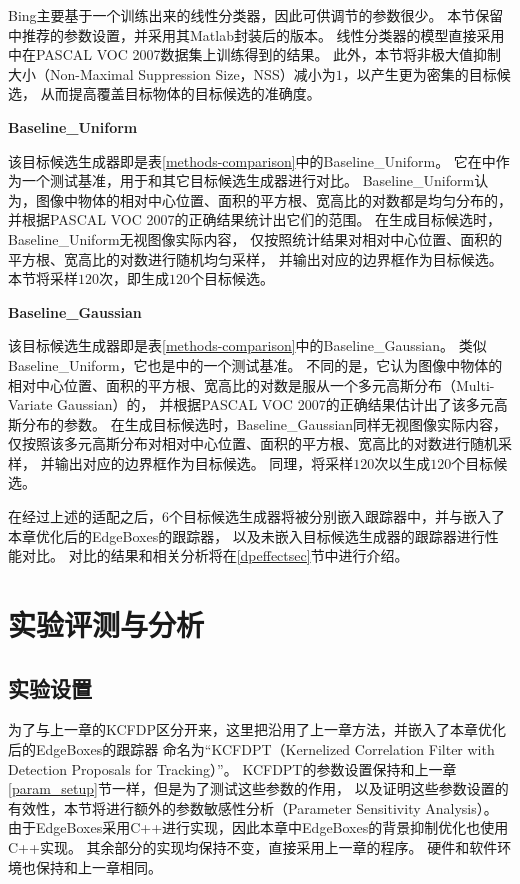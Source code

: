 Bing主要基于一个训练出来的线性分类器，因此可供调节的参数很少。
本节保留\cite{bing}中推荐的参数设置，并采用其Matlab封装后的版本。
线性分类器的模型直接采用\cite{bingImpl}中在PASCAL VOC 2007数据集上训练得到的结果。
此外，本节将非极大值抑制大小（Non-Maximal Suppression Size，NSS）减小为$1$，以产生更为密集的目标候选，
从而提高覆盖目标物体的目标候选的准确度。
\begin{compactitem}
\item \textbf{Baseline\_Uniform}
\end{compactitem}

该目标候选生成器即是表\ref{methods-comparison}中的Baseline\_Uniform。
它在\cite{dpsurvey}中作为一个测试基准，用于和其它目标候选生成器进行对比。
Baseline\_Uniform认为，图像中物体的相对中心位置、面积的平方根、宽高比的对数都是均匀分布的，
并根据PASCAL VOC 2007的正确结果统计出它们的范围。
在生成目标候选时，Baseline\_Uniform无视图像实际内容，
仅按照统计结果对相对中心位置、面积的平方根、宽高比的对数进行随机均匀采样，
并输出对应的边界框作为目标候选。
本节将采样$120$次，即生成$120$个目标候选。
\begin{compactitem}
\item \textbf{Baseline\_Gaussian}
\end{compactitem}

该目标候选生成器即是表\ref{methods-comparison}中的Baseline\_Gaussian。
类似Baseline\_Uniform，它也是\cite{dpsurvey}中的一个测试基准。
不同的是，它认为图像中物体的相对中心位置、面积的平方根、宽高比的对数是服从一个多元高斯分布（Multi-Variate Gaussian）的，
并根据PASCAL VOC 2007的正确结果估计出了该多元高斯分布的参数。
在生成目标候选时，Baseline\_Gaussian同样无视图像实际内容，
仅按照该多元高斯分布对相对中心位置、面积的平方根、宽高比的对数进行随机采样，
并输出对应的边界框作为目标候选。
同理，将采样$120$次以生成$120$个目标候选。

在经过上述的适配之后，6个目标候选生成器将被分别嵌入跟踪器中，并与嵌入了本章优化后的EdgeBoxes的跟踪器，
以及未嵌入目标候选生成器的跟踪器进行性能对比。
对比的结果和相关分析将在\ref{dpeffectsec}节中进行介绍。




\section{实验评测与分析}
\subsection{实验设置}
为了与上一章的KCFDP区分开来，这里把沿用了上一章方法，并嵌入了本章优化后的EdgeBoxes的跟踪器
命名为``KCFDPT（Kernelized Correlation Filter with Detection Proposals for Tracking）''。
KCFDPT的参数设置保持和上一章\ref{param_setup}节一样，但是为了测试这些参数的作用，
以及证明这些参数设置的有效性，本节将进行额外的参数敏感性分析（Parameter Sensitivity Analysis）。
由于EdgeBoxes采用C++进行实现，因此本章中EdgeBoxes的背景抑制优化也使用C++实现。
其余部分的实现均保持不变，直接采用上一章的程序。
硬件和软件环境也保持和上一章相同。

